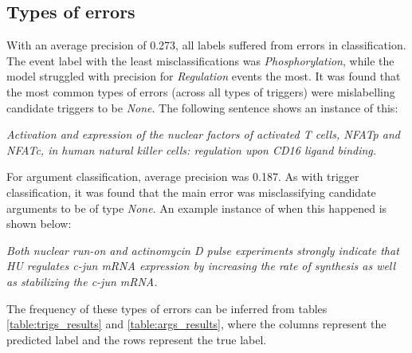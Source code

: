 \documentclass{article} %
\begin{document}
\subsection{Types of errors}
With an average precision of 0.273, all labels suffered from errors in classification. The event label with the least misclassifications was \emph{Phosphorylation}, while the model struggled with precision for \emph{Regulation} events the most. It was found that the most common types of errors (across all types of triggers) were mislabelling candidate triggers to be \emph{None}. The following sentence shows an instance of this:

\emph{Activation and expression of the nuclear factors of activated T cells, NFATp and NFATc, in human natural killer cells: regulation upon CD16 ligand binding.}

For argument classification, average precision was 0.187. As with trigger classification, it was found that the main error was misclassifying candidate arguments to be of type \emph{None}. An example instance of when this happened is shown below:

\emph{Both nuclear run-on and actinomycin D pulse experiments strongly indicate that HU regulates c-jun mRNA expression by increasing the rate of synthesis as well as stabilizing the c-jun mRNA.}

The frequency of these types of errors can be inferred from tables \ref{table:trigs_results} and \ref{table:args_results}, where the columns represent the predicted label and the rows represent the true label.
\end{document}
